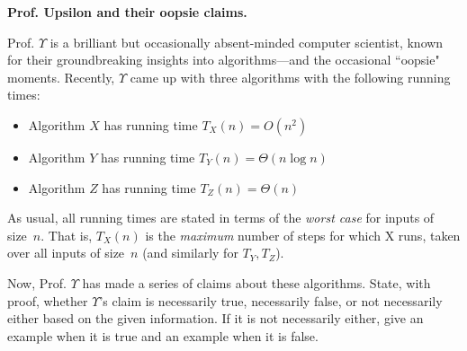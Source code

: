 \documentclass[11pt,addpoints]{exam}
\begin{document}
\begin{questions}
\newpage

  \question \textbf{Prof. Upsilon and their oopsie claims.}

  Prof. $\Upsilon$ is a brilliant but occasionally absent-minded computer scientist, known for their groundbreaking insights into algorithms—and the occasional ``oopsie" moments. Recently, $\Upsilon$ came up with three algorithms with the following running times:  
  
  \begin{itemize}
      \item Algorithm $X$ has running time $T_{X}(n) = O(n^2)$
      \item Algorithm $Y$ has running time $T_{Y}(n) = \Theta(n \log n)$
      \item Algorithm $Z$ has running time $T_{Z}(n) = \Theta(n)$
  \end{itemize}

  As usual, all running times are stated in terms of the \emph{worst case} for inputs of size~$n$.
  That is, $T_{X}(n)$ is the \emph{maximum} number of steps for which X runs, taken over all inputs of size~$n$ (and similarly for $T_{Y}, T_{Z}$).

  Now, Prof. $\Upsilon$ has made a series of claims about these algorithms.  State, with proof, whether $\Upsilon$'s claim is necessarily true, necessarily false, or not necessarily either based on the given information. If it is not necessarily either, give an example when it is true and an example when it is false. 

\end{questions}
\end{document}
